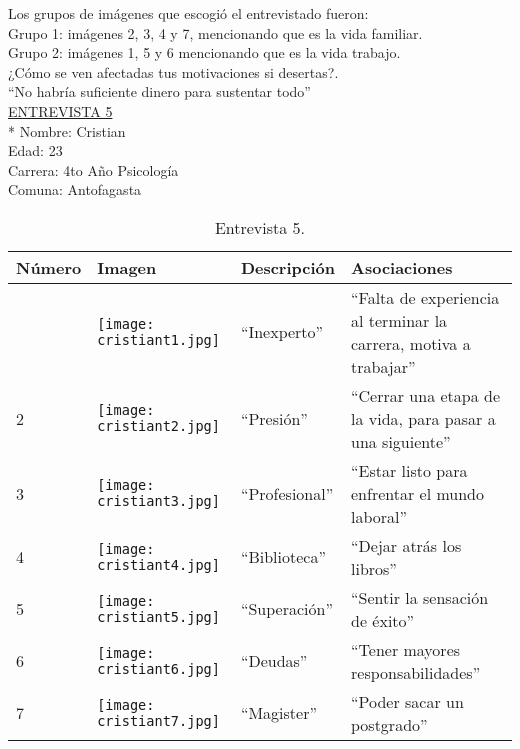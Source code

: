 Los grupos de imágenes que escogió el entrevistado fueron:\\

Grupo 1: imágenes 2, 3, 4 y 7, mencionando que es la vida familiar. \\

Grupo 2: imágenes 1, 5 y 6 mencionando que es la vida trabajo.\\


¿Cómo se ven afectadas tus motivaciones si desertas?.\\

``No habría suficiente dinero para sustentar todo''\\

\newpage
\underline {ENTREVISTA 5} \\*
Nombre: Cristian\\
Edad: 23\\
Carrera: 4to Año Psicología\\
Comuna: Antofagasta\\

\begin{table}[H]
\centering
\begin{tabular}{>{\centering\arraybackslash}m{1cm} >{\centering\arraybackslash}m{2cm} >{\arraybackslash}m{5cm}>{\arraybackslash}m{5cm}}
\hline
Número  & Imagen & Descripción & Asociaciones \\
\hline \hline

1 & \texttt{[image: cristiant1.jpg]} & ``Inexperto'' & ``Falta de experiencia al terminar la carrera, motiva a trabajar'' \\
\hline

2 & \texttt{[image: cristiant2.jpg]} & ``Presión'' & ``Cerrar una etapa de la vida, para pasar a una siguiente'' \\
\hline

3 & \texttt{[image: cristiant3.jpg]} & ``Profesional'' & ``Estar listo para enfrentar el mundo laboral'' \\
\hline

4 & \texttt{[image: cristiant4.jpg]} & ``Biblioteca'' & ``Dejar atrás los libros'' \\
\hline

5 & \texttt{[image: cristiant5.jpg]} & ``Superación'' & ``Sentir la sensación de éxito''  \\
\hline

6 & \texttt{[image: cristiant6.jpg]} & ``Deudas'' & ``Tener mayores responsabilidades''\\
\hline

7 & \texttt{[image: cristiant7.jpg]} & ``Magister'' & ``Poder sacar un postgrado'' \\
\hline

\end{tabular}
\caption{Entrevista 5.}
\label{tabla:cristiant}
\end{table}

